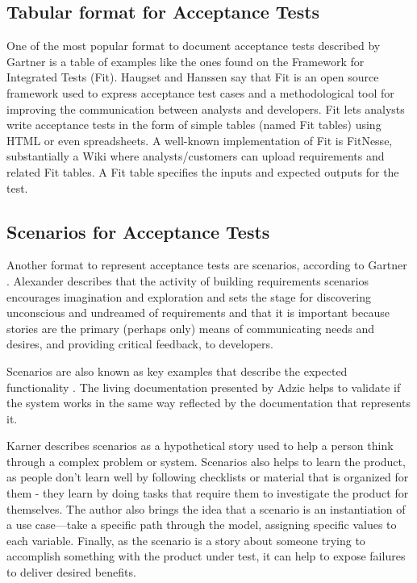 \subsection{Tabular format for Acceptance Tests}

One of the most popular format to document acceptance tests described by Gartner \cite{Gartner_2012} is a table of examples like the ones found on the Framework for Integrated Tests (Fit). Haugset and Hanssen \cite{Haugset_and_Hanssen_2011} say that Fit is an open source framework used to express acceptance test cases and a methodological tool for improving the communication between analysts and developers. Fit lets analysts write acceptance tests  in  the form of simple tables (named Fit  tables)  using HTML  or even spreadsheets. A well-known implementation of Fit is FitNesse, substantially a Wiki where analysts/customers can upload  requirements  and  related  Fit tables. A Fit table specifies the inputs and expected outputs for the test.

\subsection{Scenarios for Acceptance Tests}

Another format to represent acceptance tests are scenarios, according to Gartner \cite{Gartner_2012}. Alexander \cite{Alexander_2004} describes that the activity of building requirements scenarios encourages imagination and exploration and sets the stage for discovering unconscious and undreamed of requirements and that it is important because stories are the primary (perhaps only) means of communicating needs and desires, and providing critical feedback, to developers.

Scenarios are also known as key examples that describe the expected functionality \cite{Adzic_2011}. The living documentation presented by Adzic helps to validate if the system works in the same way reflected by the documentation that represents it.

Karner \cite{Kaner_2003} describes scenarios as a hypothetical story used to help a person think through a complex problem or system. Scenarios also helps to learn the product, as people don’t learn well by following checklists or material that is organized for them - they learn by doing tasks that require them to investigate the product for themselves. The author also brings the idea that a scenario is an instantiation of a use case—take a specific path through the model, assigning specific values to each variable. Finally, as the scenario is a story about someone trying to accomplish something with the product under test, it can help to expose failures to deliver desired benefits.

